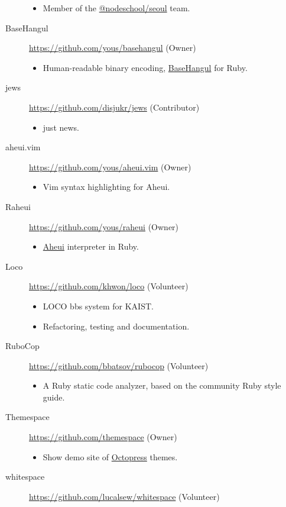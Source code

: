 \documentclass[a4paper,10pt]{article}
\begin{document}
\begin{description}
\begin{itemize}
      \item Member of the \href{https://github.com/orgs/nodeschool/teams/seoul}{@nodeschool/seoul} team.
    \end{itemize}
  \item[BaseHangul] \url{https://github.com/yous/basehangul} (Owner)
    \begin{itemize}
      \item Human-readable binary encoding, \href{https://basehangul.github.io}{BaseHangul} for Ruby.
    \end{itemize}
  \item[jews] \url{https://github.com/disjukr/jews} (Contributor)
    \begin{itemize}
      \item just news.
    \end{itemize}
  \item[aheui.vim] \url{https://github.com/yous/aheui.vim} (Owner)
    \begin{itemize}
      \item Vim syntax highlighting for Aheui.
    \end{itemize}
  \item[Raheui] \url{https://github.com/yous/raheui} (Owner)
    \begin{itemize}
      \item \href{http://aheui.github.io}{Aheui} interpreter in Ruby.
    \end{itemize}
  \item[Loco] \url{https://github.com/khwon/loco} (Volunteer)
    \begin{itemize}
      \item LOCO bbs system for KAIST\@.
      \item Refactoring, testing and documentation.
    \end{itemize}
  \item[RuboCop] \url{https://github.com/bbatsov/rubocop} (Volunteer)
    \begin{itemize}
      \item A Ruby static code analyzer, based on the community Ruby style guide.
    \end{itemize}
  \item[Themespace] \url{https://github.com/themespace} (Owner)
    \begin{itemize}
      \item Show demo site of \href{http://octopress.org}{Octopress} themes.
    \end{itemize}
  \item[whitespace] \url{https://github.com/lucalsew/whitespace} (Volunteer)

\end{description}
\end{document}
